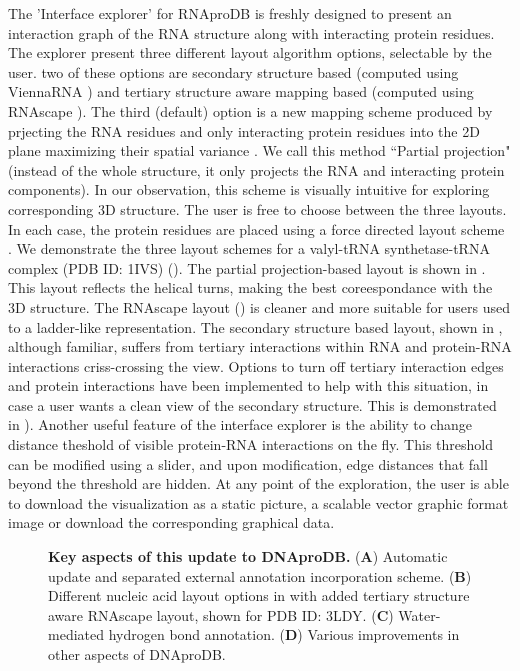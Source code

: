 The 'Interface explorer' for RNAproDB is freshly designed to present an interaction graph of the RNA structure along with interacting protein residues. The explorer present three different layout algorithm options, selectable by the user. two of these options are secondary structure based (computed using ViennaRNA \citep{Lorenz2011}) and tertiary structure aware mapping based (computed using RNAscape \citep{Mitra2024rnascape}). The third (default) option is a new mapping scheme produced by prjecting the RNA residues and only interacting protein residues into the 2D plane maximizing their spatial variance \citep{Pearson1901}. We call this method ``Partial projection" (instead of the whole structure, it only projects the RNA and interacting protein components). In our observation, this scheme is visually intuitive for exploring corresponding 3D structure. The user is free to choose between the three layouts. In each case, the protein residues are placed using a force directed layout scheme \citep{bostock2012fl}. We demonstrate the three layout schemes for a valyl-tRNA synthetase-tRNA complex (PDB ID: 1IVS) (). The partial projection-based layout is shown in . This layout reflects the helical turns, making the best coreespondance with the 3D structure. The RNAscape \citep{Mitra2024rnascape} layout () is cleaner and more suitable for users used to a ladder-like representation.  The secondary structure based layout, shown in , although familiar, suffers from tertiary interactions within RNA and protein-RNA interactions criss-crossing the view. Options to turn off tertiary interaction edges and protein interactions have been implemented to help with this situation, in case a user wants a clean view of the secondary structure. This is demonstrated in ). Another useful feature of the interface explorer is the ability to change distance theshold of visible protein-RNA interactions on the fly. This threshold can be modified using a slider, and upon modification, edge distances that fall beyond the threshold are hidden. At any point of the exploration, the user is able to download the visualization as a static picture, a scalable vector graphic format image or download the corresponding graphical data.


\begin{center}
    \begin{figure}
        \caption[Key aspects of this update to DNAproDB.]{\textbf{Key aspects of this update to DNAproDB.} ({\bf A}) Automatic update and separated external annotation incorporation scheme.  ({\bf B})  Different nucleic acid layout options in with added tertiary structure aware RNAscape layout, shown for PDB ID: 3LDY. ({\bf C}) Water-mediated hydrogen bond annotation. ({\bf D}) Various improvements in other aspects of DNAproDB. }
  \label{fig:rnaprodb2}
\end{figure}
\end{center}
